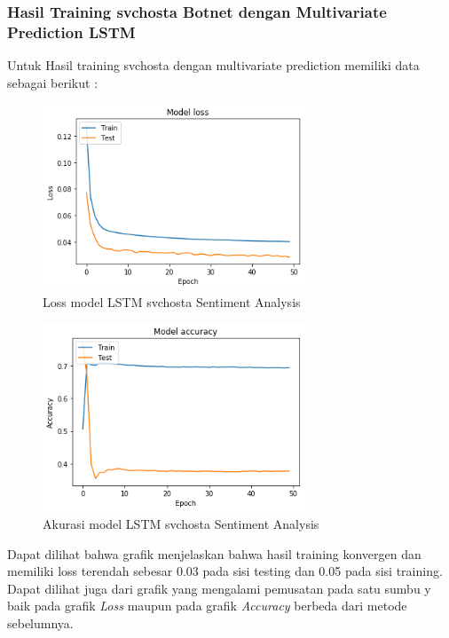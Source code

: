 \documentclass[./skripsi.tex]{subfiles}
\begin{document}
\subsubsection{Hasil Training svchosta Botnet dengan Multivariate Prediction LSTM}
\par Untuk Hasil training svchosta dengan multivariate prediction memiliki data sebagai berikut :

\begin{figure}%
	\centering
    \includegraphics[width=0.7\textwidth]{public/assets/img/lstmm_svchosta_loss.png}
    \caption{Loss model LSTM svchosta Sentiment Analysis}
    \label{fig:lstmm_svchosta_loss}
\end{figure}

\begin{figure}%
	\centering
    \includegraphics[width=0.7\textwidth]{public/assets/img/lstmm_svchosta_acc.png}
    \caption{Akurasi model LSTM svchosta Sentiment Analysis}
    \label{fig:lstmm_svchosta_acc}
\end{figure}

\par Dapat dilihat bahwa grafik menjelaskan bahwa hasil training konvergen dan memiliki loss terendah sebesar 0.03 pada sisi testing dan 0.05 pada sisi training. Dapat dilihat juga dari grafik yang mengalami pemusatan pada satu sumbu y baik pada grafik \textit{Loss} maupun pada grafik \textit{Accuracy} berbeda dari metode sebelumnya.
\end{document}
